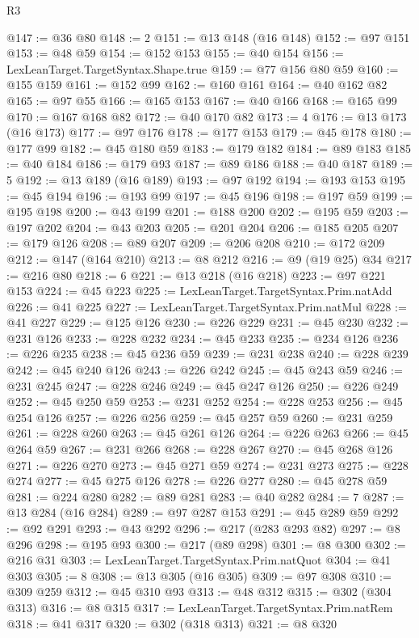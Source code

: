 \begin{lexlean}{R3}
\begin{coremodule}
@147 := @36 @80
@148 := 2
@151 := @13 @148 (@16 @148)
@152 := @97 @151
@153 := @48 @59
@154 := @152 @153
@155 := @40 @154
@156 := LexLeanTarget.TargetSyntax.Shape.true
@159 := @77 @156 @80 @59
@160 := @155 @159
@161 := @152 @99
@162 := @160 @161
@164 := @40 @162 @82
@165 := @97 @55
@166 := @165 @153
@167 := @40 @166
@168 := @165 @99
@170 := @167 @168 @82
@172 := @40 @170 @82
@173 := 4
@176 := @13 @173 (@16 @173)
@177 := @97 @176
@178 := @177 @153
@179 := @45 @178
@180 := @177 @99
@182 := @45 @180 @59
@183 := @179 @182
@184 := @89 @183
@185 := @40 @184
@186 := @179 @93
@187 := @89 @186
@188 := @40 @187
@189 := 5
@192 := @13 @189 (@16 @189)
@193 := @97 @192
@194 := @193 @153
@195 := @45 @194
@196 := @193 @99
@197 := @45 @196
@198 := @197 @59
@199 := @195 @198
@200 := @43 @199
@201 := @188 @200
@202 := @195 @59
@203 := @197 @202
@204 := @43 @203
@205 := @201 @204
@206 := @185 @205
@207 := @179 @126
@208 := @89 @207
@209 := @206 @208
@210 := @172 @209
@212 := @147 (@164 @210)
@213 := @8 @212
@216 := @9 (@19 @25) @34
@217 := @216 @80
@218 := 6
@221 := @13 @218 (@16 @218)
@223 := @97 @221 @153
@224 := @45 @223
@225 := LexLeanTarget.TargetSyntax.Prim.natAdd
@226 := @41 @225
@227 := LexLeanTarget.TargetSyntax.Prim.natMul
@228 := @41 @227
@229 := @125 @126
@230 := @226 @229
@231 := @45 @230
@232 := @231 @126
@233 := @228 @232
@234 := @45 @233
@235 := @234 @126
@236 := @226 @235
@238 := @45 @236 @59
@239 := @231 @238
@240 := @228 @239
@242 := @45 @240 @126
@243 := @226 @242
@245 := @45 @243 @59
@246 := @231 @245
@247 := @228 @246
@249 := @45 @247 @126
@250 := @226 @249
@252 := @45 @250 @59
@253 := @231 @252
@254 := @228 @253
@256 := @45 @254 @126
@257 := @226 @256
@259 := @45 @257 @59
@260 := @231 @259
@261 := @228 @260
@263 := @45 @261 @126
@264 := @226 @263
@266 := @45 @264 @59
@267 := @231 @266
@268 := @228 @267
@270 := @45 @268 @126
@271 := @226 @270
@273 := @45 @271 @59
@274 := @231 @273
@275 := @228 @274
@277 := @45 @275 @126
@278 := @226 @277
@280 := @45 @278 @59
@281 := @224 @280
@282 := @89 @281
@283 := @40 @282
@284 := 7
@287 := @13 @284 (@16 @284)
@289 := @97 @287 @153
@291 := @45 @289 @59
@292 := @92 @291
@293 := @43 @292
@296 := @217 (@283 @293 @82)
@297 := @8 @296
@298 := @195 @93
@300 := @217 (@89 @298)
@301 := @8 @300
@302 := @216 @31
@303 := LexLeanTarget.TargetSyntax.Prim.natQuot
@304 := @41 @303
@305 := 8
@308 := @13 @305 (@16 @305)
@309 := @97 @308
@310 := @309 @259
@312 := @45 @310 @93
@313 := @48 @312
@315 := @302 (@304 @313)
@316 := @8 @315
@317 := LexLeanTarget.TargetSyntax.Prim.natRem
@318 := @41 @317
@320 := @302 (@318 @313)
@321 := @8 @320

\end{coremodule}
\end{lexlean}
